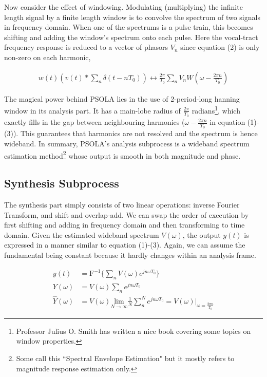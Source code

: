 \documentclass{article}
\begin{document}
Now consider the effect of windowing. Modulating (multiplying) the infinite length signal by a finite length window is to convolve the spectrum of two signals in frequency domain. When one of the spectrums is a pulse train, this becomes shifting and adding the window's spectrum onto each pulse. Here the vocal-tract frequency response is reduced to a vector of phasors $V_n$ since equation (2) is only non-zero on each harmonic,

\begin{align}
w(t) \left(v(t) \ast \sum_n \delta(t - nT_0) \right) \leftrightarrow \frac{2\pi}{T_0} \sum_n V_n W(\omega - \frac{2\pi n}{T_0})
\end{align}

The magical power behind PSOLA lies in the use of 2-period-long hanning window in its analysis part. It has a main-lobe radius of $\frac{2\pi}{T_0}$ radians\footnote{Professor Julius O. Smith has written a nice book\cite{smith} covering some topics on window properties.}, which exactly fills in the gap between neighbouring harmonics ($\omega - \frac{2\pi n}{T_0}$ in equation (1)-(3)). This guarantees that harmonics are not resolved and the spectrum is hence wideband. In summary, PSOLA's analysis subprocess is a wideband spectrum estimation method\footnote{Some call this ``Spectral Envelope Estimation" but it mostly refers to magnitude response estimation only.} whose output is smooth in both magnitude and phase.

\subsection{Synthesis Subprocess}

The synthesis part simply consists of two linear operations: inverse Fourier Transform, and shift and overlap-add. We can swap the order of execution by first shifting and adding in frequency domain and then transforming to time domain. Given the estimated wideband spectrum $V(\omega)$, the output $y(t)$ is expressed in a manner similar to equation (1)-(3). Again, we can assume the fundamental being constant because it hardly changes within an analysis frame.

\begin{align}
y(t)      &= \mathrm{F}^{-1} \{ \sum_n V(\omega) e^{j n \omega T_0} \} \\
Y(\omega) &= V(\omega) \sum_n e^{j n \omega T_0} \\
\hat Y(\omega) &= V(\omega) \underset{N \to \infty}{\mathrm{lim}} \frac{1}{N} \sum^N_n e^{j n \omega T_0} = V(\omega) |_{\omega = \frac{2\pi n}{T_0}}
\end{align}
\end{document}
